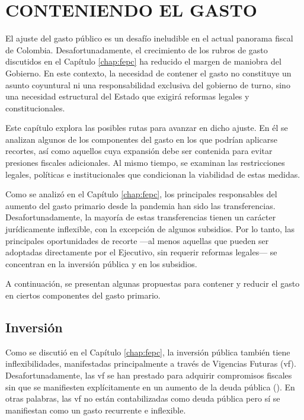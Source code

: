 \chapter{CONTENIENDO EL GASTO}\label{chap:menosgasto}

El ajuste del gasto público es un desafío ineludible en el actual panorama fiscal de Colombia. Desafortunadamente, el crecimiento de los rubros de gasto discutidos en el Capítulo \ref{chap:fepc} ha reducido el margen de maniobra del Gobierno.  En este contexto, la necesidad de contener el gasto no constituye un asunto coyuntural ni una responsabilidad exclusiva del gobierno de turno, sino una necesidad estructural del Estado que exigirá reformas legales y constitucionales.

Este capítulo explora las posibles rutas para avanzar en dicho ajuste. En él se analizan algunos de los componentes del gasto en los que podrían aplicarse recortes, así como aquellos cuya expansión debe ser contenida para evitar presiones fiscales adicionales. Al mismo tiempo, se examinan las restricciones legales, políticas e institucionales que condicionan la viabilidad de estas medidas.

 Como se analizó en el Capítulo \ref{chap:fepc}, los principales responsables del aumento del gasto primario desde la pandemia han sido las transferencias. Desafortunadamente, la mayoría de estas transferencias tienen un carácter jurídicamente inflexible, con la excepción de algunos subsidios. Por lo tanto, las principales oportunidades de recorte —al menos aquellas que pueden ser adoptadas directamente por el Ejecutivo, sin requerir reformas legales— se concentran en la inversión pública y en los subsidios.

A continuación, se presentan algunas propuestas para contener y reducir el gasto en ciertos componentes del gasto primario.

\section{Inversión}

Como se discutió en el Capítulo \ref{chap:fepc}, la inversión pública también tiene inflexibilidades, manifestadas principalmente a través de Vigencias Futuras (\gls{vf}). Desafortunadamente, las \gls{vf} se han prestado para adquirir compromisos fiscales sin que se manifiesten explícitamente en un aumento de la deuda pública (\cite{IMF2004PPP}). En otras palabras, las \gls{vf} no están contabilizadas como deuda pública pero sí se manifiestan como un gasto recurrente e inflexible.

